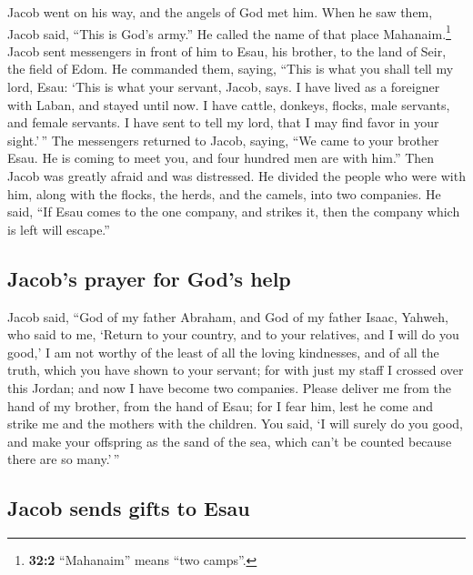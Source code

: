  Jacob went on his way, and the angels of God met him.
 When he saw them, Jacob said, ``This is God's army.'' He
called the name of that place Mahanaim.\footnote{\textbf{32:2}
  ``Mahanaim'' means ``two camps''.}  Jacob sent
messengers in front of him to Esau, his brother, to the land of Seir,
the field of Edom.  He commanded them, saying, ``This is
what you shall tell my lord, Esau: `This is what your servant, Jacob,
says. I have lived as a foreigner with Laban, and stayed until now.
 I have cattle, donkeys, flocks, male servants, and female
servants. I have sent to tell my lord, that I may find favor in your
sight.'\,''  The messengers returned to Jacob, saying,
``We came to your brother Esau. He is coming to meet you, and four
hundred men are with him.''  Then Jacob was greatly afraid
and was distressed. He divided the people who were with him, along with
the flocks, the herds, and the camels, into two companies.
 He said, ``If Esau comes to the one company, and strikes
it, then the company which is left will escape.''

\hypertarget{jacobs-prayer-for-gods-help}{%
\subsection{Jacob's prayer for God's
help}\label{jacobs-prayer-for-gods-help}}

 Jacob said, ``God of my father Abraham, and God of my
father Isaac, Yahweh, who said to me, `Return to your country, and to
your relatives, and I will do you good,'  I am not worthy
of the least of all the loving kindnesses, and of all the truth, which
you have shown to your servant; for with just my staff I crossed over
this Jordan; and now I have become two companies.  Please
deliver me from the hand of my brother, from the hand of Esau; for I
fear him, lest he come and strike me and the mothers with the children.
 You said, `I will surely do you good, and make your
offspring as the sand of the sea, which can't be counted because there
are so many.'\,''

\hypertarget{jacob-sends-gifts-to-esau}{%
\subsection{Jacob sends gifts to Esau}\label{jacob-sends-gifts-to-esau}}

